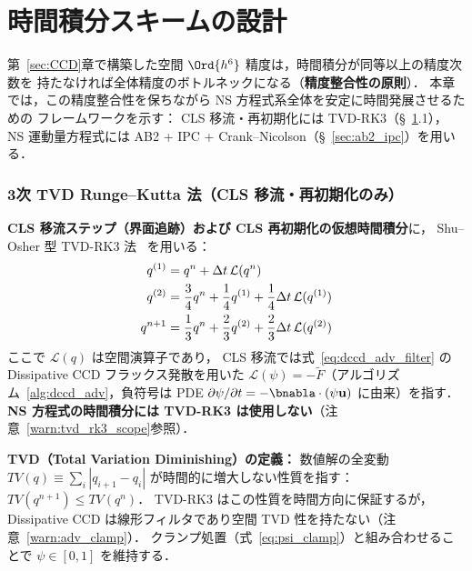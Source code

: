%
\section{時間積分スキームの設計}
\label{sec:time_int}

第~\ref{sec:CCD}章で構築した空間 $\Ord{h^6}$ 精度は，時間積分が同等以上の精度次数を
持たなければ全体精度のボトルネックになる（\textbf{精度整合性の原則}）．
本章では，この精度整合性を保ちながら NS 方程式系全体を安定に時間発展させるための
フレームワークを示す：
CLS 移流・再初期化には TVD-RK3（§~\ref{sec:time_int}.1），
NS 運動量方程式には AB2 + IPC + Crank--Nicolson（§~\ref{sec:ab2_ipc}）を用いる．

\subsubsection{3次 TVD Runge--Kutta 法（CLS 移流・再初期化のみ）}

\textbf{CLS 移流ステップ（界面追跡）および CLS 再初期化の仮想時間積分}に，
Shu--Osher 型 TVD-RK3 法~\cite{ShuOsher1988} を用いる：
\begin{align}
  q^{(1)} &= q^n + \Delta t \, \mathcal{L}(q^n) \notag\\
  q^{(2)} &= \frac{3}{4}q^n + \frac{1}{4}q^{(1)} + \frac{1}{4}\Delta t\,\mathcal{L}(q^{(1)}) \notag\\
  q^{n+1} &= \frac{1}{3}q^n + \frac{2}{3}q^{(2)} + \frac{2}{3}\Delta t\,\mathcal{L}(q^{(2)})
  \label{eq:tvd_rk3}
\end{align}
ここで $\mathcal{L}(q)$ は空間演算子であり，
CLS 移流では式~\eqref{eq:dccd_adv_filter} の Dissipative CCD フラックス発散を用いた
$\mathcal{L}(\psi) = -\tilde{F}$（アルゴリズム~\ref{alg:dccd_adv}，負符号は PDE $\partial\psi/\partial t = -\bnabla\cdot(\psi\mathbf{u})$ に由来）を指す．
\textbf{NS 方程式の時間積分には TVD-RK3 は使用しない}（注意~\ref{warn:tvd_rk3_scope}参照）．

\noindent\textbf{TVD（Total Variation Diminishing）の定義：}
数値解の全変動
$TV(q) \equiv \sum_i |q_{i+1} - q_i|$ が時間的に増大しない性質を指す：
$TV(q^{n+1}) \leq TV(q^n)$．
TVD-RK3 はこの性質を時間方向に保証するが，
Dissipative CCD は線形フィルタであり空間 TVD 性を持たない（注意~\ref{warn:adv_clamp}）．
クランプ処置（式~\eqref{eq:psi_clamp}）と組み合わせることで
$\psi \in [0,1]$ を維持する．

